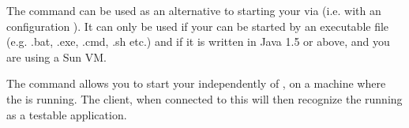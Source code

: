 


The  command can be used as an alternative to starting your \gdaut{} via \app{} (i.e. with an \gdaut{} configuration ). It can only be used if your \gdaut{} can be started by an executable file (e.g. .bat, .exe, .cmd, .sh etc.) and if it is written in Java 1.5 or above, and you are using a Sun VM. 



The command allows you to start your \gdaut{} independently of \app{}, on a machine where the \gdagent{} is running. The \app{} client, when connected to this \gdagent{} will then recognize the running \gdaut{} as a testable application. 

